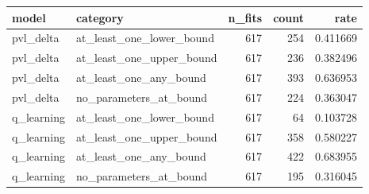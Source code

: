 \begin{tabular}{llrrr}
\toprule
model & category & n\_fits & count & rate \\
\midrule
pvl\_delta & at\_least\_one\_lower\_bound & 617 & 254 & 0.411669 \\
pvl\_delta & at\_least\_one\_upper\_bound & 617 & 236 & 0.382496 \\
pvl\_delta & at\_least\_one\_any\_bound & 617 & 393 & 0.636953 \\
pvl\_delta & no\_parameters\_at\_bound & 617 & 224 & 0.363047 \\
q\_learning & at\_least\_one\_lower\_bound & 617 & 64 & 0.103728 \\
q\_learning & at\_least\_one\_upper\_bound & 617 & 358 & 0.580227 \\
q\_learning & at\_least\_one\_any\_bound & 617 & 422 & 0.683955 \\
q\_learning & no\_parameters\_at\_bound & 617 & 195 & 0.316045 \\
\bottomrule
\end{tabular}
